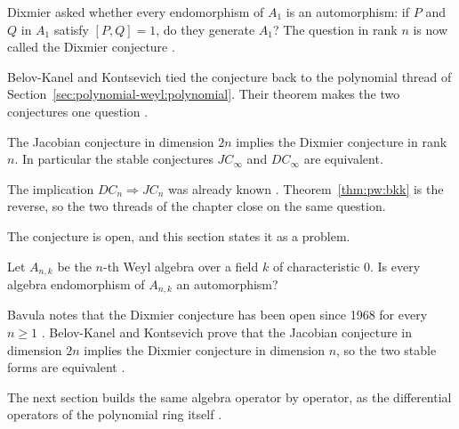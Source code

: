 \begin{remark}
\label{rem:pw:dixmier-problem}
Dixmier asked whether every endomorphism of $A_{1}$ is an automorphism:
if $P$ and $Q$ in $A_{1}$ satisfy $[P,Q]=1$, do they generate $A_{1}$?
The question in rank $n$ is now called the Dixmier conjecture
\cite[p.~1]{BelovKanelKontsevich2007}.
\end{remark}

Belov-Kanel and Kontsevich tied the conjecture back to the polynomial
thread of Section~\ref{sec:polynomial-weyl:polynomial}. Their theorem
makes the two conjectures one question \cite[p.~2]{BelovKanelKontsevich2007}.

\begin{theorem}
\label{thm:pw:bkk}
The Jacobian conjecture in dimension $2n$ implies the Dixmier conjecture
in rank $n$. In particular the stable conjectures $JC_{\infty}$ and
$DC_{\infty}$ are equivalent.
\end{theorem}

The implication $DC_{n}\Rightarrow JC_{n}$ was already known
\cite[p.~1]{BelovKanelKontsevich2007}. Theorem~\ref{thm:pw:bkk} is the
reverse, so the two threads of the chapter close on the same question. %

The conjecture is open, and this section states it as a problem. %

\begin{problem}\label{prob:open:dixmier}
Let $A_{n,k}$ be the $n$-th Weyl algebra over a field $k$ of characteristic $0$.
Is every algebra endomorphism of $A_{n,k}$ an automorphism?
\end{problem}

Bavula notes that the Dixmier conjecture has been open since 1968 for every
$n\ge1$ \cite[pp.~1--2]{Bavula2017}. Belov-Kanel and Kontsevich prove that the
Jacobian conjecture in dimension $2n$ implies the Dixmier conjecture in
dimension $n$, so the two stable forms are equivalent
\cite[Theorem~1, p.~3]{BelovKanelKontsevich2007}.

The next section builds the same algebra operator by operator, as the
differential operators of the polynomial ring itself
\cite[Theorem~6.2, p.~4]{Hazewinkel2013}.

